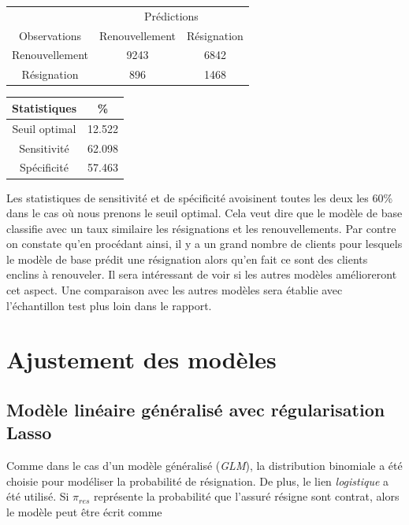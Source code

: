 \documentclass[]{article}
\begin{document}
\begin{table}[!htb]
\centering
\begin{minipage}{0.48\linewidth}
\begin{tabular}{c|cc} 
\multicolumn{1}{c}{} & \multicolumn{2}{c}{Prédictions} \\
Observations & Renouvellement & Résignation \\
\hline Renouvellement & 9243 & 6842 \\
Résignation & 896 & 1468 \\
\hline
\end{tabular}
\end{minipage}
\hfill
\begin{minipage}{0.48\linewidth}
\centering
\begin{tabular}{c|c} 
Statistiques & \% \\
\hline
Seuil optimal & 12.522  \\
Sensitivité & 62.098 \\
Spécificité & 57.463 \\
\hline
\end{tabular}
\end{minipage}
\end{table}

Les statistiques de sensitivité et de spécificité avoisinent toutes les
deux les 60\% dans le cas où nous prenons le seuil optimal. Cela veut
dire que le modèle de base classifie avec un taux similaire les
résignations et les renouvellements. Par contre on constate qu'en
procédant ainsi, il y a un grand nombre de clients pour lesquels le
modèle de base prédit une résignation alors qu'en fait ce sont des
clients enclins à renouveler. Il sera intéressant de voir si les autres
modèles amélioreront cet aspect. Une comparaison avec les autres modèles
sera établie avec l'échantillon test plus loin dans le rapport.

\newpage

\section{Ajustement des modèles}\label{ajustement-des-moduxe8les}

\subsection{Modèle linéaire généralisé avec régularisation
Lasso}\label{moduxe8le-linuxe9aire-guxe9nuxe9ralisuxe9-avec-ruxe9gularisation-lasso}

Comme dans le cas d'un modèle généralisé (\emph{GLM}), la distribution
binomiale a été choisie pour modéliser la probabilité de résignation. De
plus, le lien \emph{logistique} a été utilisé. Si \(\pi_{res}\)
représente la probabilité que l'assuré résigne sont contrat, alors le
modèle peut être écrit comme
\end{document}

